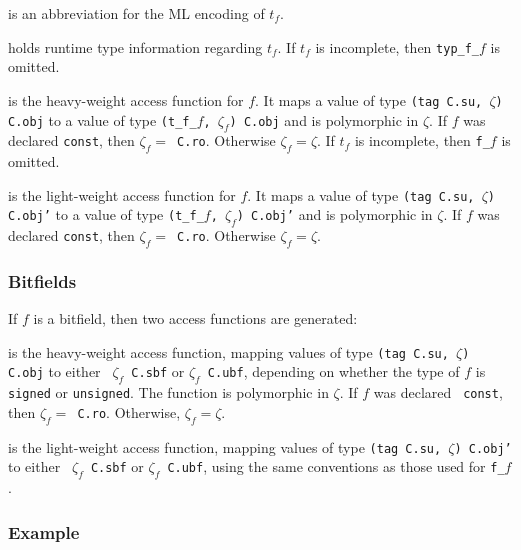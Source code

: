 \documentclass[titlepage,letterpaper]{article}
\begin{document}
\begin{description}\setlength{\itemsep}{0pt}
\item[{\tt type t\_f\_$f$}] is an abbreviation for the ML encoding of $t_f$.
\item[!{\tt val typ\_f\_$f$}] holds runtime type information regarding
  $t_f$.  If $t_f$ is incomplete, then {\tt typ\_f\_$f$} is omitted.
\item[!{\tt val f\_$f$}] is the heavy-weight access function for $f$.
  It maps a value of type {\tt (tag C.su, $\zeta$) C.obj} to a value
  of type {\tt (t\_f\_$f$, ${\zeta}_f$) C.obj} and is polymorphic in
  $\zeta$.  If $f$ was declared {\tt const}, then {\tt ${\zeta}_f =$
    C.ro}.  Otherwise ${\zeta}_f = \zeta$.  If $t_f$ is incomplete,
  then {\tt f\_$f$} is omitted.
\item[{\tt val f\_$f$'}] is the light-weight access function for $f$.
  It maps a value of type {\tt (tag C.su, $\zeta$) C.obj'} to a value
  of type {\tt (t\_f\_$f$, ${\zeta}_f$) C.obj'} and is polymorphic in
  $\zeta$.  If $f$ was declared {\tt const}, then {\tt ${\zeta}_f =$
    C.ro}.  Otherwise ${\zeta}_f = \zeta$.
\end{description}

\subsubsection*{Bitfields}

If $f$ is a bitfield, then two access functions are generated:

\begin{description}\setlength{\itemsep}{0pt}
\item[{\tt val f\_$f$}] is the heavy-weight access function, mapping
  values of type {\tt (tag C.su, $\zeta$) C.obj} to either {\tt
    ${\zeta}_f$ C.sbf} or {\tt ${\zeta}_f$ C.ubf}, depending on
  whether the type of $f$ is {\tt signed} or {\tt unsigned}.  The
  function is polymorphic in $\zeta$.  If $f$ was declared {\tt
    const}, then {\tt ${\zeta}_f =$ C.ro}.  Otherwise, ${\zeta}_f =
  \zeta$.
\item[{\tt val f\_$f$'}] is the light-weight access function, mapping
  values of type {\tt (tag C.su, $\zeta$) C.obj'} to either {\tt
    ${\zeta}_f$ C.sbf} or {\tt ${\zeta}_f$ C.ubf}, using the same
  conventions as those used for {\tt f\_$f$}.
\end{description}

\subsubsection*{Example}
\end{document}
